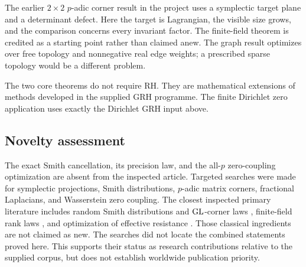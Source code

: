 The earlier \(2\times2\) \(p\)-adic corner result in the project uses a
symplectic target plane and a determinant defect. Here the target is
Lagrangian, the visible size grows, and the comparison concerns every
invariant factor. The finite-field theorem is credited as a starting
point rather than claimed anew. The graph result optimizes over free
topology and nonnegative real edge weights; a prescribed sparse topology
would be a different problem.

The two core theorems do not require RH. They are mathematical extensions
of methods developed in the supplied GRH programme. The finite Dirichlet
zero application uses exactly the Dirichlet GRH input above.

\subsection{Novelty assessment}
The exact Smith cancellation, its precision law, and the all-\(p\)
zero-coupling optimization are absent from the inspected article.
Targeted searches were made for symplectic projections, Smith
distributions, \(p\)-adic matrix corners, fractional Laplacians, and
Wasserstein zero coupling. The closest inspected primary literature
includes random Smith distributions and \(\operatorname{GL}\)-corner laws
\cite{WangStanley,VanPeski2021,VanPeski2024}, finite-field rank laws
\cite{FulmanGoldstein}, and optimization of effective resistance
\cite{GhoshBoydSaberi}. Those classical ingredients are not claimed as new.
The searches did not locate the combined statements proved here. This
supports their status as research contributions relative to the supplied
corpus, but does not establish worldwide publication priority.
